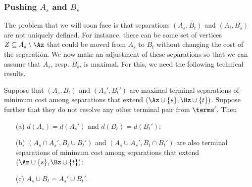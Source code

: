 \subsubsection{Pushing $A_s$ and $B_s$}

The problem that we will soon face is that separations $(A_s,B_t)$ and $(A_t,B_s)$ are not uniquely defined. For instance, there can be some set of vertices $Z\subseteq A_s\setminus \Az$ that could be moved from $A_s$ to $B_t$ without changing the cost of the separation. We now make an adjustment of these separations so that we can assume that $A_s$, resp. $B_s$, is maximal. For this, we need the following technical results.

\begin{lemma}\label{lem:patch}
Suppose that $(A_s,B_t)$ and $(A_s',B_t')$ are maximal terminal separations of minimum cost among separations that extend $(\Az\cup \{s\},\Bz\cup \{t\})$. Suppose further that they do not resolve any other terminal pair from $\terms'$. Then
\begin{itemize}
\item[(a)] $d(A_s)=d(A_s')$ and $d(B_t)=d(B_t')$;
\item[(b)] $(A_s\cap A_s',B_t\cup B_t')$ and $(A_s\cup A_s',B_t\cap B_t')$ are also terminal separations of minimum cost among separations that extend $(\Az\cup \{s\},\Bz\cup \{t\})$;
\item[(c)] $A_s\cup B_t=A_s'\cup B_t'$.
\end{itemize}
\end{lemma}
